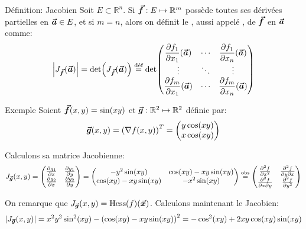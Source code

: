 \documentclass[a4paper]{article}
\begin{document}
\begin{parag}{Définition: Jacobien}
    Soit $E \subset \mathbb{R}^n$. Si $\bm{\protect\vec{f}}: E \mapsto \mathbb{R}^m$ possède toutes ses dérivées partielles en $\bm{\protect\vec{a}}\in E$, et si $m = n$, alors on définit le , aussi appelé , de $\bm{\protect\vec{f}}$ en $\bm{\protect\vec{a}}$ comme: 
    \[\left|J_{\bvec{f}}\left(\bvec{a}\right)\right| = \det\left(J_{\bvec{f}}\left(\bvec{a}\right)\right) \over{=}{déf} \det\begin{pmatrix} \dfrac{\partial f_1}{\partial x_1}\left(\bvec{a}\right) & \cdots & \dfrac{\partial f_1}{\partial x_n}\left(\bvec{a}\right) \\ \vdots & \ddots & \vdots \\ \dfrac{\partial f_m}{\partial x_1}\left(\bvec{a}\right) & \cdots & \dfrac{\partial f_m}{\partial x_n}\left(\bvec{a}\right) \end{pmatrix}\]
\end{parag}

\begin{parag}{Exemple}
    Soient $\bvec{f}\left(x, y\right) = \sin\left(xy\right)$ et $\bm{\protect\vec{g}} : \mathbb{R}^2 \mapsto \mathbb{R}^2$ définie par: 
    \[\bvec{g}\left(x, y\right) = \left(\nabla f\left(x, y\right)\right)^T = \begin{pmatrix} y \cos\left(xy\right) \\ x\cos\left(xy\right) \end{pmatrix} \]

    Calculons sa matrice Jacobienne:
    \[J_{\bvec{g}}\left(x, y\right) = \begin{pmatrix} \frac{\partial g_1}{\partial x} & \frac{\partial g_1}{\partial y} \\ \frac{\partial g_2}{\partial x} & \frac{\partial g_2}{\partial y} \end{pmatrix} = \begin{pmatrix} -y^2 \sin\left(xy\right) & \cos\left(xy\right) - xy\sin\left(xy\right) \\ \cos\left(xy\right) - xy\sin\left(xy\right) & -x^2 \sin\left(xy\right) \end{pmatrix} \over{=}{obs} \begin{pmatrix} \frac{\partial^2 f}{\partial x^2} & \frac{\partial^{2} f}{\partial y \partial x} \\ \frac{\partial^2 f}{\partial x \partial y} & \frac{\partial^2 f}{\partial y^2} \end{pmatrix} \]
    
    On remarque que $J_{\bvec{g}}\left(x, y\right) = \Hess\left(f\right)\left(\bvec{x}\right)$. Calculons maintenant le Jacobien: 
    \[\left|J_{\bvec{g}}\left(x, y\right)\right| = x^2 y^2 \sin^2\left(xy\right) - \left(\cos\left(xy\right) - xy\sin\left(xy\right)\right)^2 = -\cos^2\left(xy\right) + 2xy\cos\left(xy\right)\sin\left(xy\right)\]
\end{parag}
 
\end{document}
